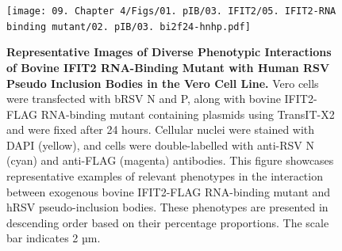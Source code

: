 \begin{figure}
    \centering
    \texttt{[image: 09. Chapter 4/Figs/01. pIB/03. IFIT2/05. IFIT2-RNA binding mutant/02. pIB/03. bi2f24-hnhp.pdf]}
    \caption[Representative Images of Diverse Phenotypic Interactions of Bovine IFIT2 RNA-Binding Mutant with Human RSV Pseudo Inclusion Bodies in the Vero Cell Line.]{\textbf{Representative Images of Diverse Phenotypic Interactions of Bovine IFIT2 RNA-Binding Mutant with Human RSV Pseudo Inclusion Bodies in the Vero Cell Line.}  Vero cells were transfected with bRSV N and P, along with bovine IFIT2-FLAG RNA-binding mutant containing plasmids using TransIT-X2 and were fixed after 24 hours. Cellular nuclei were stained with DAPI (yellow), and cells were double-labelled with anti-RSV N (cyan) and anti-FLAG (magenta) antibodies. This figure showcases representative examples of relevant phenotypes in the interaction between exogenous bovine IFIT2-FLAG RNA-binding mutant and hRSV pseudo-inclusion bodies. These phenotypes are presented in descending order based on their percentage proportions. The scale bar indicates 2 µm.}
    \label{fig:Representative Images of Diverse Phenotypic Interactions of Bovine IFIT2 RNA-Binding Mutant with Human RSV Pseudo Inclusion Bodies in the Vero Cell Line}
\end{figure}

